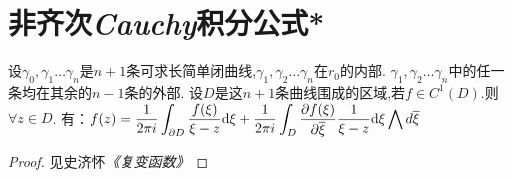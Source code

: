 \section{非齐次\emph{Cauchy}积分公式*}
\begin{theorem}
	设$\gamma_0,\gamma_1\dots \gamma_n$是$n+1$条可求长简单闭曲线,$\gamma_1,\gamma_2\dots \gamma_n$在$r_0$的内部.
	$\gamma_1,\gamma_2\dots \gamma_n$中的任一条均在其余的$n-1$条的外部.
	设$D$是这$n+1$条曲线围成的区域,若$f\in C^1(D)$.则$\forall z\in D$.
	有：$\displaystyle{f(z)=\frac{1}{2\pi i}\int_{\partial D}\frac{f(\xi)}{\xi-z}\mathrm{d}\xi
		+\frac{1}{2\pi i}\int_D\frac{\partial f(\xi)}{\partial\overline{\xi}}\frac{1}{\xi-z}\mathrm{d}\xi\bigwedge d\overline{\xi}}$
\end{theorem}
\begin{proof}
	见史济怀\emph{《复变函数》}
\end{proof}